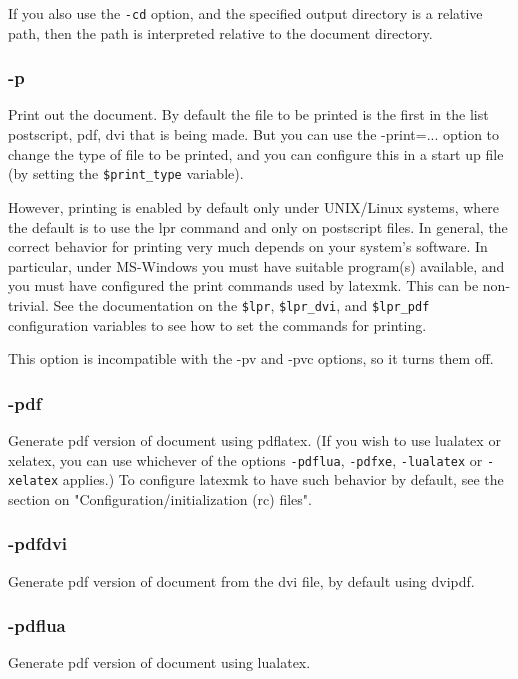If  you also use the \verb|-cd| option, and the specified output directory is a
relative path, then the path is  interpreted  relative to the document
directory.


\subsubsection{-p}

Print  out  the  document.  By default the file to be printed is the first in
the list postscript, pdf, dvi that is  being  made.  But you can use the
-print=... option to change the type of file to be printed, and you can
configure this in a start up file (by setting the \verb|$print_type| variable).

However,  printing  is  enabled by default only under UNIX/Linux
systems, where the default is to use the lpr command and only on
postscript files.  In general, the correct behavior for printing very much
depends on your system's software.  In particular, under  MS-Windows you must
have suitable program(s) available, and you must have configured the print
commands  used  by  latexmk.  This  can  be  non-trivial.   See the
documentation on the \verb|$lpr|, \verb|$lpr_dvi|, and \verb|$lpr_pdf|
configuration variables to see how to set
the commands for printing.

This option is incompatible with the -pv and -pvc options, so it
turns them off.

\subsubsection{-pdf}

Generate pdf version of document using pdflatex.  (If  you  wish to use
lualatex or xelatex, you can use whichever of the options \verb|-pdflua|, \verb|-pdfxe|,
\verb|-lualatex| or \verb|-xelatex| applies.)   To  configure latexmk  to  have  such
behavior by default, see the section on "Configuration/initialization (rc)
files".

\subsubsection{-pdfdvi}

Generate pdf version of document from the dvi file,  by  default
using dvipdf.

\subsubsection{-pdflua}
Generate pdf version of document using lualatex.

